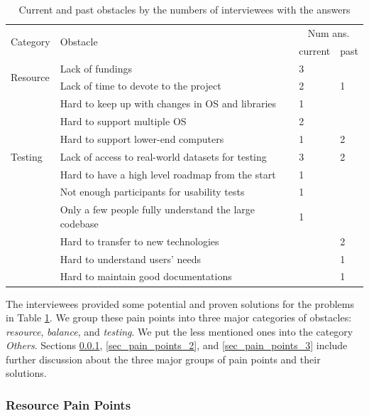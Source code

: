 \documentclass[3p, 12pt,authoryear]{elsarticle}
\begin{document}
\begin{table}[ht]
\centering
\begin{tabular}{llll}
\hline
\multirow{2}{*}{Category} & \multirow{2}{*}{Obstacle} & \multicolumn{2}{c}{Num ans.} \\ \cline{3-4} 
 &  & current & past \\ \hline
\multirow{2}{*}{Resource} & Lack of fundings & 3 &  \\
 & Lack of time to devote to the project & 2 & 1 \\ \hdashline
\multirow{3}{*}{Balance} & Hard to keep up with changes in OS and libraries & 1 &  \\
 & Hard to support multiple OS & 2 &  \\
 & Hard to support lower-end computers & 1 & 2 \\ \hdashline
Testing & Lack of access to real-world datasets for testing & 3 & 2 \\ \hdashline
\multirow{7}{*}{Others}
 & Hard to have a high level roadmap from the start & 1 &  \\
 & Not enough participants for usability tests & 1 &  \\
 & Only a few people fully understand the large codebase & 1 &  \\
 & Hard to transfer to new technologies & & 2 \\
 & Hard to understand users' needs & & 1 \\
 & Hard to maintain good documentations & & 1 \\ \hline
\end{tabular}
\caption{\label{tab_obstacles}Current and past obstacles by the numbers of interviewees with the answers}
\end{table}

The interviewees provided some potential and proven solutions for the problems
in Table \ref{tab_obstacles}. We group these pain points into three major
categories of obstacles: \textit{resource}, \textit{balance}, and
\textit{testing}. We put the less mentioned ones into the category
\textit{Others}. Sections \ref{sec_pain_points_1}, \ref{sec_pain_points_2}, and
\ref{sec_pain_points_3} include further discussion about the three major groups
of pain points and their solutions.

\subsubsection{Resource Pain Points} \label{sec_pain_points_1}
\end{document}
